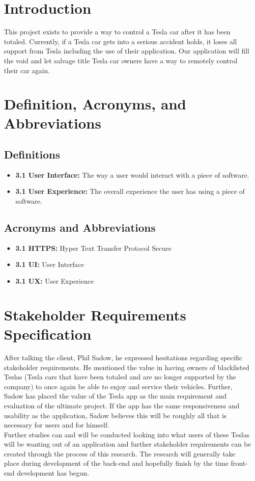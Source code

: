 \documentclass[onecolumn, draftclsnofoot,10pt, compsoc]{IEEEtran}
\begin{document}
\section{Introduction}
This project exists to provide a way to control a Tesla car after it has been totaled.
Currently, if a Tesla car gets into a serious accident holds, it loses all support from Tesla including the use of their application.
Our application will fill the void and let salvage title Tesla car owners have a way to remotely control their car again.

\section{Definition, Acronyms, and Abbreviations}
\subsection{Definitions}
\begin{itemize}
    \item \textbf{3.1 User Interface:} The way a user would interact with a piece of software.
    \item \textbf{3.1 User Experience:} The overall experience the user has using a piece of software.
\end{itemize}
\subsection{Acronyms and Abbreviations}
\begin{itemize}
    \item \textbf{3.1 HTTPS:} Hyper Text Transfer Protocol Secure
    \item \textbf{3.1 UI:} User Interface
    \item \textbf{3.1 UX:} User Experience
\end{itemize}
\section{Stakeholder Requirements Specification}
After talking the client, Phil Sadow, he expressed hesitations regarding specific stakeholder requirements. He mentioned the value in having owners of blacklisted Teslas (Tesla cars that have been totaled and are no longer supported by the company) to once again be able to enjoy and service their vehicles. Further, Sadow has placed the value of the Tesla app as the main requirement and evaluation of the ultimate project. If the app has the same responsiveness and usability as the application, Sadow believes this will be roughly all that is necessary for users and for himself.\\
Further studies can and will be conducted looking into what users of these Teslas will be wanting out of an application and further stakeholder requirements can be created through the process of this research. The research will generally take place during development of the back-end and hopefully finish by the time front-end development has begun. 
\end{document}
